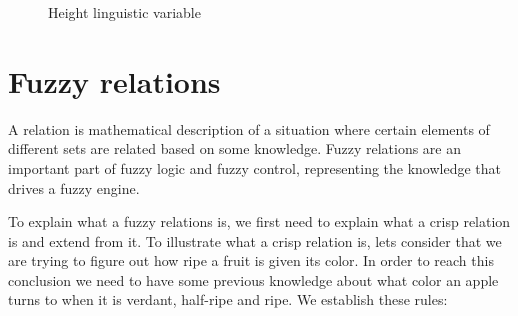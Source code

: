 \begin{figure}[h!]
    \centerline{}
    \caption[Height linguistic variable]{Height linguistic variable}
\end{figure}


\section{Fuzzy relations}

\qquad A relation is mathematical description of a situation where certain elements of different sets are related
based on some knowledge. Fuzzy relations are an important part of fuzzy logic and fuzzy control, representing
the knowledge that drives a fuzzy engine.

\qquad To explain what a fuzzy relations is, we first need to explain what a crisp relation is and extend from
it. To illustrate what a crisp relation is, lets consider that we are trying to figure out how ripe a fruit is
given its color. In order to reach this conclusion we need to have some previous knowledge about what color
an apple turns to when it is verdant, half-ripe and ripe. We establish these rules:
